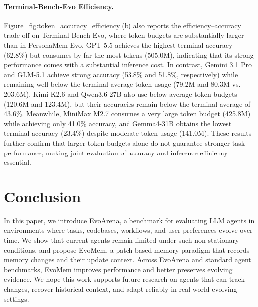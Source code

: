 \documentclass{article}
\begin{document}
\paragraph{Terminal-Bench-Evo Efficiency.}
Figure~\ref{fig:token_accuracy_efficiency}(b) also reports the efficiency--accuracy trade-off on Terminal-Bench-Evo, where token budgets are substantially larger than in PersonaMem-Evo. GPT-5.5 achieves the highest terminal accuracy (62.8\%) but consumes by far the most tokens (505.0M), indicating that its strong performance comes with a substantial inference cost. In contrast, Gemini 3.1 Pro and GLM-5.1 achieve strong accuracy (53.8\% and 51.8\%, respectively) while remaining well below the terminal average token usage (79.2M and 80.3M vs. 203.6M). Kimi K2.6 and Qwen3.6-27B also use below-average token budgets (120.6M and 123.4M), but their accuracies remain below the terminal average of 43.6\%. Meanwhile, MiniMax M2.7 consumes a very large token budget (425.8M) while achieving only 41.0\% accuracy, and Gemma4-31B obtains the lowest terminal accuracy (23.4\%) despite moderate token usage (141.0M). These results further confirm that larger token budgets alone do not guarantee stronger task performance, making joint evaluation of accuracy and inference efficiency essential.



\section{Conclusion}










In this paper, we introduce EvoArena, a benchmark for evaluating LLM agents in environments where tasks, codebases, workflows, and user preferences evolve over time. We show that current agents remain limited under such non-stationary conditions, and propose EvoMem, a patch-based memory paradigm that records memory changes and their update context. Across EvoArena and standard agent benchmarks, EvoMem improves performance and better preserves evolving evidence. We hope this work supports future research on agents that can track changes, recover historical context, and adapt reliably in real-world evolving settings.


\newpage






\newpage
\end{document}

